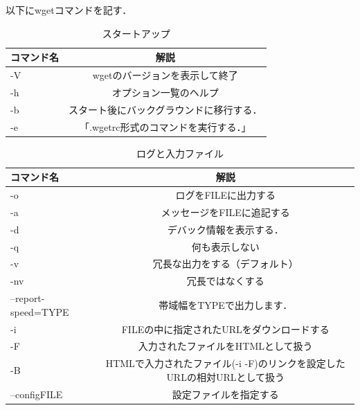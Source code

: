 以下にwgetコマンドを記す\cite{wget}．

\begin{table}[H]
  \begin{center}
    \caption{スタートアップ}
    \begin{tabular}{|l|c|} \hline
      コマンド名 & 解説  \\ \hline
      -V & wgetのバージョンを表示して終了  \\
      -h & オプション一覧のヘルプ  \\
      -b & スタート後にバックグラウンドに移行する．  \\
-e & 「.wgetrc形式のコマンドを実行する．」  \\ \hline
    \end{tabular}
  \end{center}
\end{table}

\begin{table}[H]
  \begin{center}
    \caption{ログと入力ファイル}
    \begin{tabular}{|l|c|} \hline
      コマンド名 & 解説  \\ \hline
      -o & ログをFILEに出力する  \\
      -a & メッセージをFILEに追記する  \\
      -d & デバック情報を表示する．  \\
-q & 何も表示しない  \\
-v & 冗長な出力をする（デフォルト）  \\
-nv & 冗長ではなくする  \\
--report-speed=TYPE & 帯域幅をTYPEで出力します．  \\
-i & FILEの中に指定されたURLをダウンロードする  \\
-F & 入力されたファイルをHTMLとして扱う  \\
-B & HTMLで入力されたファイル(-i -F)のリンクを設定したURLの相対URLとして扱う  \\
--configFILE & 設定ファイルを指定する  \\ \hline
    \end{tabular}
  \end{center}
\end{table}

\newpage

